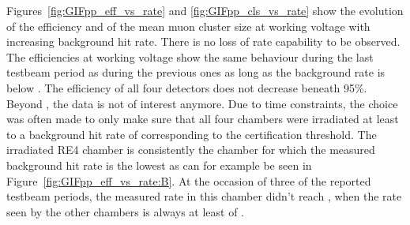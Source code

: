 	Figures~\ref{fig:GIFpp_eff_vs_rate} and \ref{fig:GIFpp_cls_vs_rate} show the evolution of the efficiency and of the mean muon cluster size at working voltage with increasing background hit rate. There is no loss of rate capability to be observed. The efficiencies at working voltage show the same behaviour during the last testbeam period as during the previous ones as long as the background rate is below . The efficiency of all four detectors does not decrease beneath 95\%. Beyond , the data is not of interest anymore. Due to time constraints, the choice was often made to only make sure that all four chambers were irradiated at least to a background hit rate of  corresponding to the certification threshold. The irradiated RE4 chamber is consistently the chamber for which the measured background hit rate is the lowest as can for example be seen in Figure~\ref{fig:GIFpp_eff_vs_rate:B}. At the occasion of three of the reported testbeam periods, the measured rate in this chamber didn't reach , when the rate seen by the other chambers is always at least of .
	
